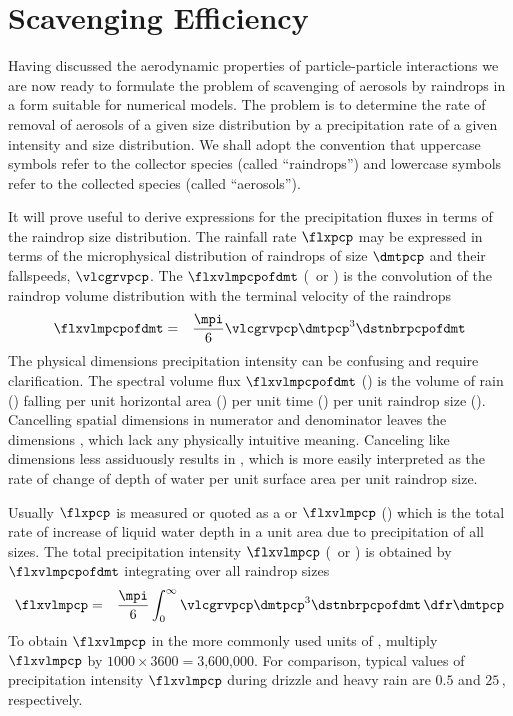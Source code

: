 \documentclass[12pt,twoside]{book}
\begin{document}
\section{Scavenging Efficiency}\label{sxn:scv_fsh}
Having discussed the aerodynamic properties of particle-particle
interactions we are now ready to formulate the problem of scavenging
of aerosols by raindrops in a form suitable for numerical models.
The problem is to determine the rate of removal of aerosols of a given
size distribution by a precipitation rate of a given intensity and
size distribution.
We shall adopt the convention that uppercase symbols refer to the
collector species (called ``raindrops'') and lowercase symbols refer
to the collected species (called ``aerosols'').

It will prove useful to derive expressions for the precipitation
fluxes in terms of the raindrop size distribution.
The rainfall rate $\flxpcp$ may be expressed in terms of the 
microphysical distribution of raindrops of size $\dmtpcp$ and their
fallspeeds, $\vlcgrvpcp$.  
The  $\flxvlmpcpofdmt$ 
(\mCxmSsm\ or \mxsm) is the convolution of the raindrop volume
distribution with the terminal velocity of the raindrops
\begin{eqnarray}
\flxvlmpcpofdmt & = & \frac{\mpi}{6} \vlcgrvpcp \dmtpcp^{3}
\dstnbrpcpofdmt 
\label{eqn:flx_vlm_pcp_spc_dfn}
\end{eqnarray}
The physical dimensions precipitation intensity can be confusing and 
require clarification.
The spectral volume flux $\flxvlmpcpofdmt$ (\mCxmSsm) is the volume of
rain (\mC) falling per unit horizontal area (\xmS) per unit time (\xs)
per unit raindrop size (\xm).  
Cancelling spatial dimensions in numerator and denominator leaves
the dimensions \xs, which lack any physically intuitive meaning.
Canceling like dimensions less assiduously results in \mxsm, which
is more easily interpreted as the rate of change of depth of water per
unit surface area per unit raindrop size.

Usually $\flxpcp$ is measured or quoted as a  or  $\flxvlmpcp$ (\mxs)
which is the total rate of increase of liquid water depth in a unit
area due to precipitation of all sizes.
The total precipitation intensity $\flxvlmpcp$ (\mCxmSs\ or \mxs) is
obtained by $\flxvlmpcpofdmt$ integrating over all raindrop sizes
\begin{eqnarray}
\flxvlmpcp & = & \frac{\mpi}{6}
\int_{0}^{\infty} \vlcgrvpcp \dmtpcp^{3} \dstnbrpcpofdmt \,\dfr\dmtpcp
\label{eqn:flx_vlm_pcp_dfn}
\end{eqnarray}
To obtain $\flxvlmpcp$ in the more commonly used units of \mmxhr,
multiply $\flxvlmpcp$ by $1000 \times 3600 = \mbox{3,600,000}$.
For comparison, typical values of precipitation intensity $\flxvlmpcp$
during drizzle and heavy rain are $0.5$ and $25$\,\mmxhr, respectively.
\end{document}
